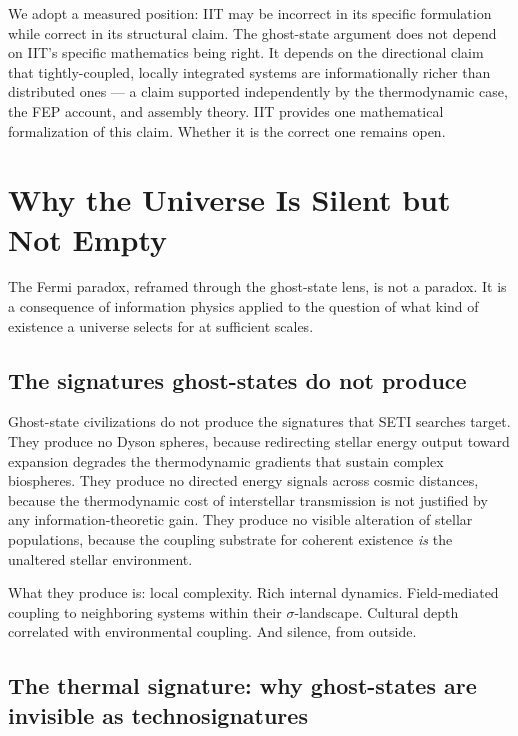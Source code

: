\documentclass[12pt, a4paper]{article}
\begin{document}
We adopt a measured position: IIT may be incorrect in its specific formulation while correct
in its structural claim. The ghost-state argument does not depend on IIT's specific
mathematics being right. It depends on the directional claim that tightly-coupled, locally
integrated systems are informationally richer than distributed ones --- a claim supported
independently by the thermodynamic case, the FEP account, and assembly theory. IIT provides
one mathematical formalization of this claim. Whether it is the correct one remains open.

\newpage
\section{Why the Universe Is Silent but Not Empty}

\begin{pullquote}
The Fermi paradox, reframed through the ghost-state lens, is not a paradox. It is a
consequence of information physics applied to the question of what kind of existence
a universe selects for at sufficient scales.
\end{pullquote}

\subsection{The signatures ghost-states do not produce}

Ghost-state civilizations do not produce the signatures that SETI searches target. They
produce no Dyson spheres, because redirecting stellar energy output toward expansion degrades
the thermodynamic gradients that sustain complex biospheres. They produce no directed energy
signals across cosmic distances, because the thermodynamic cost of interstellar transmission
is not justified by any information-theoretic gain. They produce no visible alteration of
stellar populations, because the coupling substrate for coherent existence \textit{is} the
unaltered stellar environment.

What they produce is: local complexity. Rich internal dynamics. Field-mediated coupling to
neighboring systems within their $\sigma$-landscape. Cultural depth correlated with
environmental coupling. And silence, from outside.

\subsection{The thermal signature: why ghost-states are invisible as technosignatures}
\end{document}
